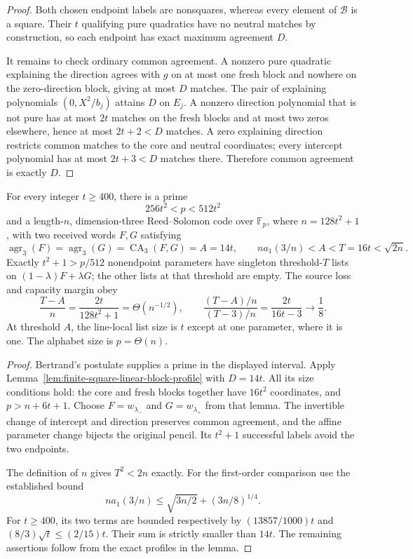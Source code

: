 \begin{proof}
Both chosen endpoint labels are nonsquares, whereas every element
of $\mathcal B$ is a square.  Their $t$ qualifying pure quadratics
have no neutral matches by construction, so each endpoint has
exact maximum agreement $D$.

It remains to check ordinary common agreement.  A nonzero pure
quadratic explaining the direction agrees with $g$ on at most
one fresh block and nowhere on the zero-direction block, giving
at most $D$ matches.  The pair of explaining polynomials
$(0,X^2/b_j)$ attains $D$ on $E_j$.  A nonzero direction polynomial
that is not pure has at most $2t$ matches on the fresh blocks and
at most two zeros elsewhere, hence at most $2t+2<D$ matches.
A zero explaining direction restricts common matches to the core
and neutral coordinates; every intercept polynomial has at most
$2t+3<D$ matches there.  Therefore common agreement is exactly $D$.
\end{proof}

\begin{theorem}
\label{thm:square-linear-block-bank}
For every integer $t\ge400$, there is a prime
\[
 256t^2<p<512t^2
\]
and a length-$n$, dimension-three Reed--Solomon code over $\mathbb F_p$,
where $n=128t^2+1$, with two received words $F,G$ satisfying
\[
 \operatorname{agr}_3(F)=\operatorname{agr}_3(G)
 =\operatorname{CA}_3(F,G)=A=14t,
 \qquad n a_1(3/n)<A<T=16t<\sqrt{2n}.
\]
Exactly $t^2+1>p/512$ nonendpoint parameters have singleton
threshold-$T$ lists on $(1-\lambda)F+\lambda G$; the other lists
at that threshold are empty.  The source loss and capacity margin obey
\[
 \frac{T-A}{n}=\frac{2t}{128t^2+1}=\Theta(n^{-1/2}),
 \qquad
 \frac{(T-A)/n}{(T-3)/n}=\frac{2t}{16t-3}\longrightarrow\frac18.
\]
At threshold $A$, the line-local list size is $t$ except at one
parameter, where it is one.  The alphabet size is $p=\Theta(n)$.
\end{theorem}
\begin{proof}
Bertrand's postulate supplies a prime in the displayed interval.
Apply Lemma~\ref{lem:finite-square-linear-block-profile} with $D=14t$.
All its size conditions hold: the core and fresh blocks together
have $16t^2$ coordinates, and $p>n+6t+1$.
Choose $F=w_{\lambda_-}$ and $G=w_{\lambda_+}$ from that lemma.
The invertible change of intercept and direction preserves common
agreement, and the affine parameter change bijects the original
pencil.  Its $t^2+1$ successful labels avoid the two endpoints.

The definition of $n$ gives $T^2<2n$ exactly.  For the first-order
comparison use the established bound
\[
 n a_1(3/n)\le\sqrt{3n/2}+(3n/8)^{1/4}.
\]
For $t\ge400$, its two terms are bounded respectively by
$(13857/1000)t$ and $(8/3)\sqrt t\le(2/15)t$.
Their sum is strictly smaller than $14t$.
The remaining assertions follow from the exact profiles in the lemma.
\end{proof}

